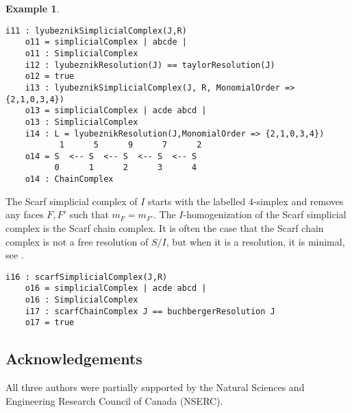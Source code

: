 \documentclass[12pt,leqno]{amsart}
\theoremstyle{definition}
\newtheorem{example}[lemma]{Example}
\begin{document}
\begin{example}
\begin{lstlisting}[basicstyle={\ttfamily \scriptsize}, xleftmargin=-23pt]
    i11 : lyubeznikSimplicialComplex(J,R)
    o11 = simplicialComplex | abcde |
    o11 : SimplicialComplex
    i12 : lyubeznikResolution(J) == taylorResolution(J)
    o12 = true
    i13 : lyubeznikSimplicialComplex(J, R, MonomialOrder => {2,1,0,3,4})
    o13 = simplicialComplex | acde abcd |
    o13 : SimplicialComplex
    i14 : L = lyubeznikResolution(J,MonomialOrder => {2,1,0,3,4})
           1      5      9      7      2
    o14 = S  <-- S  <-- S  <-- S  <-- S
          0      1      2      3      4
    o14 : ChainComplex
\end{lstlisting}
The Scarf simplicial complex of $I$ starts with the labelled $4$-simplex and removes any faces $F,F'$ such that $m_F = m_{F'}$. The $I$-homogenization of the Scarf simplicial complex is the Scarf chain complex. It is often the case that the Scarf chain complex is not a free resolution of $S/I$, but when it is a resolution, it is minimal, see \cite[Lemma 3.1]{BPS}.
\begin{lstlisting}[basicstyle={\ttfamily \scriptsize}, xleftmargin=-23pt]
    i16 : scarfSimplicialComplex(J,R)
    o16 = simplicialComplex | acde abcd |
    o16 : SimplicialComplex
    i17 : scarfChainComplex J == buchbergerResolution J
    o17 = true
\end{lstlisting}
\end{example}

\subsection*{Acknowledgements}
All three authors were partially supported by the Natural Sciences and
Engineering Research Council of Canada (NSERC).
\end{document}
